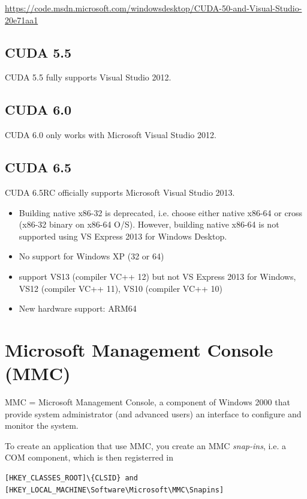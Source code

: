 \url{https://code.msdn.microsoft.com/windowsdesktop/CUDA-50-and-Visual-Studio-20e71aa1}


\subsection{CUDA 5.5}

CUDA 5.5 fully supports Visual Studio 2012.

\subsection{CUDA 6.0}

CUDA 6.0 only works with Microsoft Visual Studio 2012.

\subsection{CUDA 6.5}

CUDA 6.5RC officially supports Microsoft Visual Studio 2013.

\begin{itemize}
  \item Building native x86-32 is deprecated, i.e. choose either native x86-64
  or cross (x86-32 binary on x86-64 O/S). However, building native x86-64 is not
  supported using VS Express 2013 for Windows Desktop.
  
  \item No support for Windows XP (32 or 64)
  \item support VS13 (compiler VC++ 12) but not VS Express 2013 for Windows,
  VS12 (compiler VC++ 11), VS10 (compiler VC++ 10)
  
  \item New hardware support: ARM64
\end{itemize}

\section{Microsoft Management Console (MMC)}


MMC = Microsoft Management Console, a component of Windows 2000 that provide
system administrator (and advanced users) an interface to configure and monitor
the system.

To create an application that use MMC, you create an MMC {\it snap-ins}, i.e. a
COM component, which is then registerred in
\begin{verbatim}
[HKEY_CLASSES_ROOT]\{CLSID} and
[HKEY_LOCAL_MACHINE\Software\Microsoft\MMC\Snapins]
\end{verbatim}

